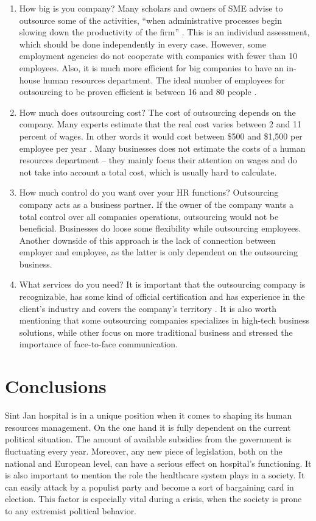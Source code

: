 \documentclass[a4paper,fleqn,11pt,dvips,titlepage]{article}
\numberwithin{figure}{section}
\numberwithin{equation}{section}
\begin{document}
\begin{enumerate}
  \item How big is you company? Many scholars and owners of SME advise to outsource some of the activities, “when administrative processes begin slowing down the productivity of the firm” \cite{gutner}. This is an individual assessment, which should be done independently in every case. However, some employment agencies do not cooperate with companies with fewer than 10 employees. Also, it is much more efficient for big companies to have an in-house human resources department. The ideal number of employees for outsourcing to be proven efficient is between 16 and 80 people \cite{gutner}.
  \item How much does outsourcing cost? The cost of outsourcing depends on the company. Many experts estimate that the real cost varies between 2 and 11 percent of wages. In other words it would cost between \$500 and \$1,500 per employee per year \cite{gutner}. Many businesses does not estimate the costs of a human resources department – they mainly focus their attention on wages and do not take into account a total cost, which is usually hard to calculate.
  \item How much control do you want over your HR functions? Outsourcing company acts as a business partner. If the owner of the company wants a total control over all companies operations, outsourcing would not be beneficial. Businesses do loose some flexibility while outsourcing employees. Another downside of this approach is the lack of connection between employer and employee, as the latter is only dependent on the outsourcing business.
  \item What services do you need? It is important that the outsourcing company is recognizable, has some kind of official certification and has experience in the client’s industry and covers the company’s territory \cite{gutner}. It is also worth mentioning that some outsourcing companies specializes in high-tech business solutions, while other focus on more traditional business and stressed the importance of face-to-face communication. 
\end{enumerate}


\section{Conclusions}

Sint Jan hospital is in a unique position when it comes to shaping its human resources management. On the one hand it is fully dependent on the current political situation. The amount of available subsidies from the government is fluctuating every year. Moreover, any new piece of legislation, both on the national and European level, can have a serious effect on hospital’s functioning. It is also important to mention the role the healthcare system plays in a society. It can easily attack by a populist party and become a sort of bargaining card in election. This factor is especially vital during a crisis, when the society is prone to any extremist political behavior. 
\end{document}
